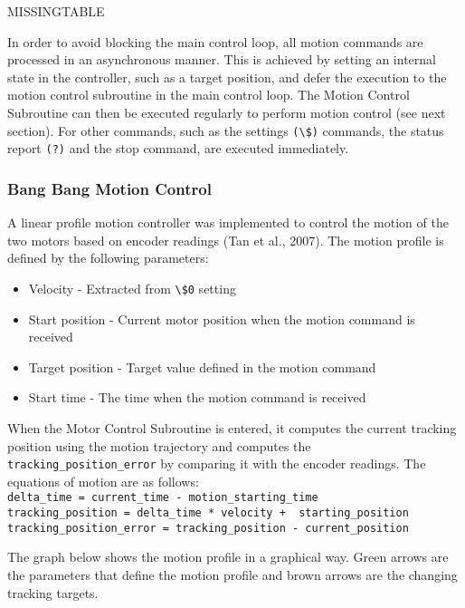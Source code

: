 MISSINGTABLE

In order to avoid blocking the main control loop, all motion commands are processed in an asynchronous manner. This is achieved by setting an internal state in the controller, such as a target position, and defer the execution to the motion control subroutine in the main control loop. The Motion Control Subroutine can then be executed regularly to perform motion control (see next section).
For other commands, such as the settings \verb|(\$)| commands, the status report \verb|(?)| and the stop command, are executed immediately. 

\subsubsection{Bang Bang Motion Control}
\label{subsubsection:exploration_1_bang_bang_motion_control}

A linear profile motion controller was implemented to control the motion of the two motors based on encoder readings (Tan et al., 2007). The motion profile is defined by the following parameters:
\begin{itemize}
    \item Velocity - Extracted from \verb|\$0| setting
    \item Start position - Current motor position when the motion command is received
    \item Target position - Target value defined in the motion command
    \item Start time - The time when the motion command is received
\end{itemize}

When the Motor Control Subroutine is entered, it computes the current tracking position using the motion trajectory and computes the \verb|tracking_position_error| by comparing it with the encoder readings. The equations of motion are as follows: \\
{
\scriptsize
\verb|delta_time = current_time - motion_starting_time|\\
\verb|tracking_position = delta_time * velocity +  starting_position|\\
\verb|tracking_position_error = tracking_position - current_position|\\
}

The graph below shows the motion profile in a graphical way. Green arrows are the parameters that define the motion profile and brown arrows are the changing tracking targets.

